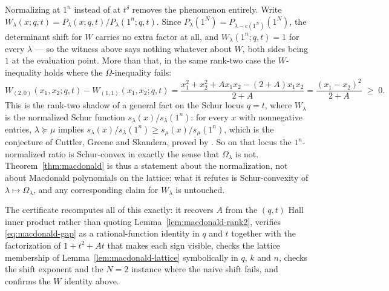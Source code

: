 Normalizing at $1^n$ instead of at $t^\delta$ removes the phenomenon entirely.
Write $W_\lambda(x;q,t)=P_\lambda(x;q,t)/P_\lambda(1^n;q,t)$.  Since
$P_\lambda(1^N)=P_{\lambda-c(1^N)}(1^N)$, the determinant shift for $W$ carries
no extra factor at all, and $W_\lambda(1^n;q,t)=1$ for every $\lambda$ --- so the
witness above says nothing whatever about $W$, both sides being $1$ at the
evaluation point.  More than that, in the same rank-two case the $W$-inequality
holds where the $\Omega$-inequality fails:
\[
W_{(2,0)}(x_1,x_2;q,t)-W_{(1,1)}(x_1,x_2;q,t)
=\frac{x_1^2+x_2^2+Ax_1x_2-(2+A)x_1x_2}{2+A}
=\frac{(x_1-x_2)^2}{2+A}\;\ge\;0 .
\]
This is the rank-two shadow of a general fact on the Schur locus $q=t$, where
$W_\lambda$ is the normalized Schur function $s_\lambda(x)/s_\lambda(1^n)$: for
every $x$ with nonnegative entries, $\lambda\succeq\mu$ implies
$s_\lambda(x)/s_\lambda(1^n)\ge s_\mu(x)/s_\mu(1^n)$, which is the conjecture of
Cuttler, Greene and Skandera, proved by \citet{SraNormalizedSchur2016}.  So on
that locus the $1^n$-normalized ratio is Schur-convex in exactly the sense that
$\Omega_\lambda$ is not.
Theorem~\ref{thm:macdonald} is thus a statement about the normalization, not about
Macdonald polynomials on the lattice: what it refutes is Schur-convexity of
$\lambda\mapsto\Omega_\lambda$, and any corresponding claim for $W_\lambda$ is
untouched.

The certificate 
recomputes all of this exactly: it recovers $A$ from the $(q,t)$ Hall inner
product rather than quoting Lemma~\ref{lem:macdonald-rank2}, verifies
\eqref{eq:macdonald-gap} as a rational-function identity in $q$ and $t$ together
with the factorization of $1+t^2+At$ that makes each sign visible, checks the
lattice membership of Lemma~\ref{lem:macdonald-lattice} symbolically in $q$, $k$ and
$n$, checks the shift exponent and the $N=2$ instance where the naive shift
fails, and confirms the $W$ identity above.

